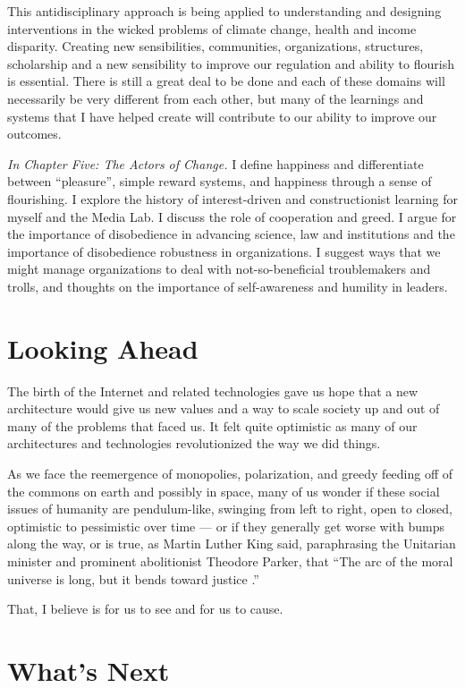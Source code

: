 This antidisciplinary approach is being applied to understanding and designing interventions in the wicked problems of climate change, health and income disparity. Creating new sensibilities, communities, organizations, structures, scholarship and a new sensibility to improve our regulation and ability to flourish is essential. There is still a great deal to be done and each of these domains will necessarily be very different from each other, but many of the learnings and systems that I have helped create will contribute to our ability to improve our outcomes.

\emph{In Chapter Five: The Actors of Change.} I define happiness and differentiate between ``pleasure'', simple reward systems, and happiness through a sense of flourishing. I explore the history of interest-driven and constructionist learning for myself and the Media Lab. I discuss the role of cooperation and greed. I argue for the importance of disobedience in advancing science, law and institutions and the importance of disobedience robustness in organizations. I suggest ways that we might manage organizations to deal with not-so-beneficial troublemakers and trolls, and thoughts on the importance of self-awareness and humility in leaders.

\section{Looking Ahead}

The birth of the Internet and related technologies gave us hope that a new architecture would give us new values and a way to scale society up and out of many of the problems that faced us. It felt quite optimistic as many of our architectures and technologies revolutionized the way we did things.

As we face the reemergence of monopolies, polarization, and greedy feeding off of the commons on earth and possibly in space, many of us wonder if these social issues of humanity are pendulum-like, swinging from left to right, open to closed, optimistic to pessimistic over time --- or if they generally get worse with bumps along the way, or is true, as Martin Luther King said, paraphrasing the Unitarian minister and prominent abolitionist Theodore Parker, that ``The arc of the moral universe is long, but it bends toward justice \cite{parker1853justice}.''

That, I believe is for us to see and for us to cause.

\section{What's Next}

